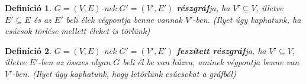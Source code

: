 \documentclass[a4paper,12pt,twoside]{book}
\newtheorem{defi}{Definíció}[chapter]
\theoremstyle{break}
\begin{document}
\begin{defi}
 $G=(V,E)$-nek $G'=(V',E')$ \textbf{részgráf}ja, ha $V' \subseteq V$, illetve $E' \subseteq E$ és az $E'$ beli élek végpontja benne vannak $V'$-ben. (Ilyet úgy kaphatunk, ha csúcsok törlése mellett éleket is törlünk)
\begin{center}
\end{center}
\end{defi}

\begin{defi}
 $G=(V,E)$-nek $G'=(V',E')$ \textbf{feszített részgráf}ja, ha $V' \subseteq V$, illetve $E'$-ben az összes olyan $G$ beli él be van húzva, aminek végpontja benne van $V'$-ben. (Ilyet úgy kaphatunk, hogy letörlünk csúcsokat a gráfból)
\end{defi}
\end{document}

